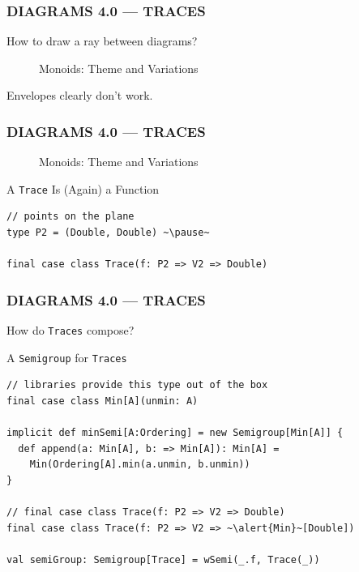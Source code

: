 \documentclass{beamer}
\begin{document}
\begin{frame} \frametitle{DIAGRAMS 4.0 --- TRACES}
How to draw a ray between diagrams?

  \begin{figure}
      \centering
      \caption{Monoids: Theme and Variations}
  \end{figure}

Envelopes clearly don't work.
\end{frame}

\begin{frame}[fragile] \frametitle{DIAGRAMS 4.0 --- TRACES}
  \begin{figure}
      \centering
      \caption{Monoids: Theme and Variations}
  \end{figure}

  \begin{block}{A \texttt{Trace} Is (Again) a Function}
  \begin{lstlisting}
// points on the plane
type P2 = (Double, Double) ~\pause~

final case class Trace(f: P2 => V2 => Double)
  \end{lstlisting}
  \vspace{-0.4cm}
  \end{block}
\end{frame}

\begin{frame}[fragile] \frametitle{DIAGRAMS 4.0 --- TRACES}
  How do \texttt{Traces} compose?

  \begin{block}{A \texttt{Semigroup} for \texttt{Traces}}
  \begin{lstlisting}
// libraries provide this type out of the box
final case class Min[A](unmin: A)

implicit def minSemi[A:Ordering] = new Semigroup[Min[A]] {
  def append(a: Min[A], b: => Min[A]): Min[A] =
    Min(Ordering[A].min(a.unmin, b.unmin))
}

// final case class Trace(f: P2 => V2 => Double)
final case class Trace(f: P2 => V2 => ~\alert{Min}~[Double])

val semiGroup: Semigroup[Trace] = wSemi(_.f, Trace(_))
  \end{lstlisting}
  \end{block}
\end{frame}
\end{document}
